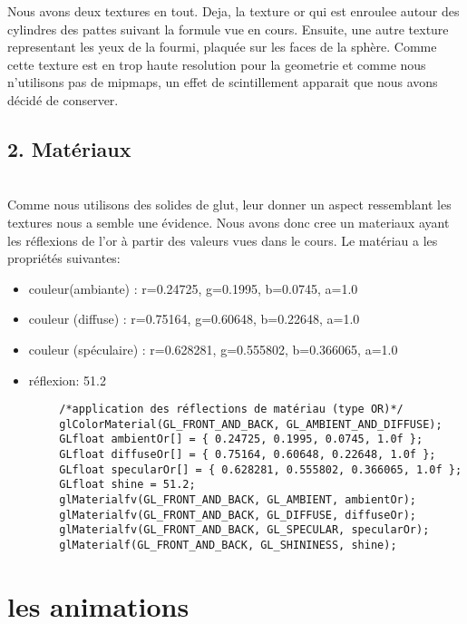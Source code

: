 \documentclass[11pt]{article}
\begin{document}
    \vspace{\baselineskip}
    
    Nous avons deux textures en tout. Deja, la texture or qui est enroulee autour des cylindres des pattes suivant la formule vue en cours. Ensuite, une autre texture representant les yeux de la fourmi, plaquée sur les faces de la sphère. Comme cette texture est en trop haute resolution pour la geometrie et comme nous n'utilisons pas de mipmaps, un effet de scintillement apparait que nous avons décidé de conserver.

    \vspace{\baselineskip}
    
    \subsection*{2. Matériaux}
    \\
    Comme nous utilisons des solides de glut, leur donner un aspect ressemblant les textures nous a semble une évidence. Nous avons donc cree un materiaux ayant les réflexions de l'or à partir des valeurs vues dans le cours. 
    Le matériau a les propriétés suivantes:
    \begin{itemize}
        \item couleur(ambiante) : r=0.24725, g=0.1995, b=0.0745, a=1.0
        \item couleur (diffuse) : r=0.75164, g=0.60648, b=0.22648, a=1.0
        \item couleur (spéculaire) : r=0.628281, g=0.555802, b=0.366065, a=1.0
        \item réflexion: 51.2
    \end{itemize}
    \begin{lstlisting}
        /*application des réflections de matériau (type OR)*/
        glColorMaterial(GL_FRONT_AND_BACK, GL_AMBIENT_AND_DIFFUSE);
        GLfloat ambientOr[] = { 0.24725, 0.1995, 0.0745, 1.0f };
        GLfloat diffuseOr[] = { 0.75164, 0.60648, 0.22648, 1.0f };
        GLfloat specularOr[] = { 0.628281, 0.555802, 0.366065, 1.0f };
        GLfloat shine = 51.2;
        glMaterialfv(GL_FRONT_AND_BACK, GL_AMBIENT, ambientOr);
        glMaterialfv(GL_FRONT_AND_BACK, GL_DIFFUSE, diffuseOr);
        glMaterialfv(GL_FRONT_AND_BACK, GL_SPECULAR, specularOr);
        glMaterialf(GL_FRONT_AND_BACK, GL_SHININESS, shine);
    \end{lstlisting}
    
\newpage
\fancyhf{}
    \section*{\Large{les animations}}
\end{document}

